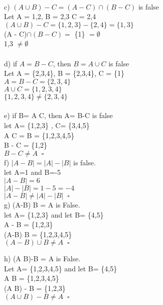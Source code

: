 \documentclass[12pt]{article}
\begin{document}
\\
c) $(A \cup B) - C = (A - C) \cap (B - C)$ is false \\ 
Let A = {1,2}, B = {2,3} C = {2,4}\\
$(A \cup B) - C =  \{1,2,3\} - \{2,4\}  = \{1,3\}$\\
(A - C)$ \cap (B - C) = $ \{1\} $ = \emptyset$\\
{1,3} $ \neq \emptyset$ \\ 
\\
d) if $A = B - C$, then $B = A \cup C$ is false \\
Let A = \{2,3,4\}, B = \{2,3,4\}, C = \{1\} \\
$A = B - C = \{2,3,4\}$ \\
$A \cup C = \{1,2,3,4\}$ \\
$\{1,2,3,4\} \neq \{2,3,4\}$ \\

\\

e) if B= A \cup C, then A= B-C is false\\
let A= \{1,2,3\} , C= \{3,4,5\} \\
A \cup C = B = \{1,2,3,4,5\} \\
B - C = \{1,2\} \\
$B-C \neq A \;\; \square$ \\

f) $|A-B| = |A|-|B|$ is false. \\
let A=1 and B=-5 \\
$|A-B| = 6 $\\
$|A|-|B|=1-5=-4$ \\
$|A-B| \neq |A|-|B| \;\; \square$\\

g) (A-B) \cup B = A is False.\\
let A= \{1,2,3\} and let B= \{4,5\} \\
A - B = \{1,2,3\} \\
(A-B) \cup B = \{1,2,3,4,5\} \\
$(A-B) \cup B \neq A \;\; \square$



h) (A \cup B)-B = A is False.\\
Let A= \{1,2,3,4,5\} and let B= \{4,5\} \\
A \cup B = \{1,2,3,4,5\} \\
(A \cup B) - B = \{1,2,3\} \\
$(A \cup B)-B \neq A \;\; \square$\\
\vspace{0.15in}
\end{document}
